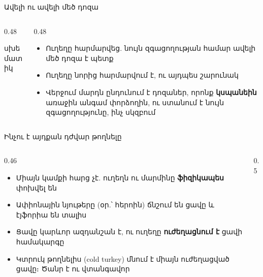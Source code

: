\begin{frame}{Ավելի ու ավելի մեծ դոզա}
  \begin{columns}[c]
    \begin{column}{0.48\textwidth}
      \centering
      \par
      {\scriptsize սխեմատիկ}
    \end{column}
    \begin{column}{0.48\textwidth}
      \begin{itemize}
        \item Ուղեղը հարմարվեց. նույն զգացողության համար ավելի մեծ դոզա է պետք
        \item<2-> Ուղեղը նորից հարմարվում է, ու այդպես շարունակ
        \item<5-> Վերջում մարդն ընդունում է դոզաներ, որոնք \textbf{կսպանեին} առաջին անգամ փորձողին, ու ստանում է նույն զգացողությունը, ինչ սկզբում
      \end{itemize}
    \end{column}
  \end{columns}
\end{frame}

\begin{frame}{Ինչու է այդքան դժվար թողնելը}
  \begin{columns}[c]
    \begin{column}{0.46\textwidth}
      \begin{itemize}
        \item Միայն կամքի հարց չէ. ուղեղն ու մարմինը \textbf{ֆիզիկապես} փոխվել են
        \item Ափիոնային նյութերը (օր.՝ հերոին) ճնշում են ցավը և էյֆորիա են տալիս
        \item<2-> Ցավը կարևոր ազդանշան է, ու ուղեղը \textbf{ուժեղացնում է} ցավի համակարգը
        \item<3-> Կտրուկ թողնելիս (cold turkey) մնում է միայն ուժեղացված ցավը։ Ծանր է ու վտանգավոր
      \end{itemize}
    \end{column}
    \begin{column}{0.5\textwidth}
      \centering
      
    \end{column}
  \end{columns}
\end{frame}

